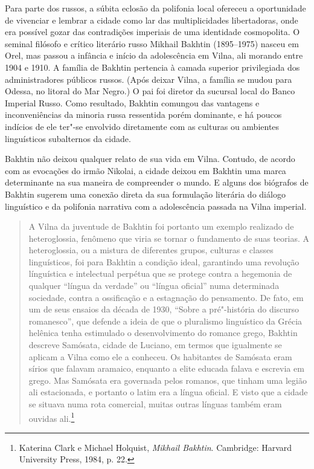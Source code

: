 Para parte dos russos, a súbita eclosão da polifonia local ofereceu a
oportunidade de vivenciar e lembrar a cidade como lar das
multiplicidades libertadoras, onde era possível gozar das contradições
imperiais de uma identidade cosmopolita. O seminal filósofo e crítico
literário russo Mikhail Bakhtin (1895--1975) nasceu em Orel, mas passou a
infância e início da adolescência em Vilna, ali morando entre 1904 e
1910. A família de Bakhtin pertencia à camada superior privilegiada dos
administradores públicos russos. (Após deixar Vilna, a família se mudou
para Odessa, no litoral do Mar Negro.) O pai foi diretor da sucursal
local do Banco Imperial Russo. Como resultado, Bakhtin comungou das
vantagens e inconveniências da minoria russa ressentida porém
dominante, e há poucos indícios de ele ter"-se envolvido diretamente com
as culturas ou ambientes linguísticos subalternos da cidade.

Bakhtin não deixou qualquer relato de sua vida em Vilna. Contudo, de
acordo com as evocações do irmão Nikolai, a cidade deixou em Bakhtin uma
marca determinante na sua maneira de compreender o mundo. E alguns dos
biógrafos de Bakhtin sugerem uma conexão direta da sua formulação
literária do diálogo linguístico e da polifonia narrativa com a
adolescência passada na Vilna imperial.

\begin{quote}
A Vilna da juventude de Bakhtin foi portanto um exemplo realizado de
heteroglossia, fenômeno que viria se tornar o fundamento de suas
teorias. A heteroglossia, ou a mistura de diferentes grupos, culturas e
classes linguísticos, foi para Bakhtin a condição ideal, garantindo uma
revolução línguística e intelectual perpétua que se protege contra a
hegemonia de qualquer ``língua da verdade'' ou ``língua oficial'' numa
determinada sociedade, contra a ossificação e a estagnação do
pensamento. De fato, em um de seus ensaios da década de 1930, ``Sobre a
pré"-história do discurso romanesco'', que defende a ideia de que o
pluralismo linguístico da Grécia helênica tenha estimulado o
desenvolvimento do romance grego, Bakhtin descreve Samósata, cidade de
Luciano, em termos que igualmente se aplicam a Vilna como ele a
conheceu. Os habitantes de Samósata eram sírios que falavam aramaico,
enquanto a elite educada falava e escrevia em grego. Mas Samósata era
governada pelos romanos, que tinham uma legião ali estacionada, e
portanto o latim era a língua oficial. E visto que a cidade se situava
numa rota comercial, muitas outras línguas também eram ouvidas
ali.\footnote{Katerina Clark e Michael Holquist, \textit{Mikhail Bakhtin}. Cambridge: Harvard University Press, 1984, p. 22.} 
\end{quote}

